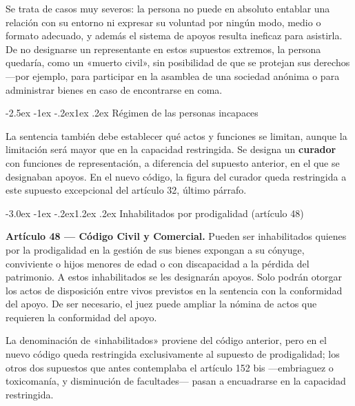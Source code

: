 \documentclass[12pt,oneside]{book}
\makeatletter
\renewcommand\section{\@startsection{section}{1}{\z@}%
  {-3.0ex \@plus -1ex \@minus -.2ex}{1.2ex \@plus .2ex}%
  {\normalfont\large\bfseries\color{acento}}}
\renewcommand\subsection{\@startsection{subsection}{2}{\z@}%
  {-2.5ex \@plus -1ex \@minus -.2ex}{1ex \@plus .2ex}%
  {\normalfont\normalsize\bfseries}}
\makeatother
\begin{document}

Se trata de casos muy severos: la persona no puede en absoluto entablar una relación con su entorno ni expresar su voluntad por ningún modo, medio o formato adecuado, y además el sistema de apoyos resulta ineficaz para asistirla. De no designarse un representante en estos supuestos extremos, la persona quedaría, como un «muerto civil», sin posibilidad de que se protejan sus derechos ---por ejemplo, para participar en la asamblea de una sociedad anónima o para administrar bienes en caso de encontrarse en coma.

\subsection{Régimen de las personas incapaces}

La sentencia también debe establecer qué actos y funciones se limitan, aunque la limitación será mayor que en la capacidad restringida. Se designa un \textbf{curador} con funciones de representación, a diferencia del supuesto anterior, en el que se designaban apoyos. En el nuevo código, la figura del curador queda restringida a este supuesto excepcional del artículo 32, último párrafo.

\section{Inhabilitados por prodigalidad (artículo 48)}

\begin{importante}
\textbf{Artículo 48 --- Código Civil y Comercial.} Pueden ser inhabilitados quienes por la prodigalidad en la gestión de sus bienes expongan a su cónyuge, conviviente o hijos menores de edad o con discapacidad a la pérdida del patrimonio. A estos inhabilitados se les designarán apoyos. Solo podrán otorgar los actos de disposición entre vivos previstos en la sentencia con la conformidad del apoyo. De ser necesario, el juez puede ampliar la nómina de actos que requieren la conformidad del apoyo.
\end{importante}

La denominación de «inhabilitados» proviene del código anterior, pero en el nuevo código queda restringida exclusivamente al supuesto de prodigalidad; los otros dos supuestos que antes contemplaba el artículo 152 bis ---embriaguez o toxicomanía, y disminución de facultades--- pasan a encuadrarse en la capacidad restringida.
\end{document}
